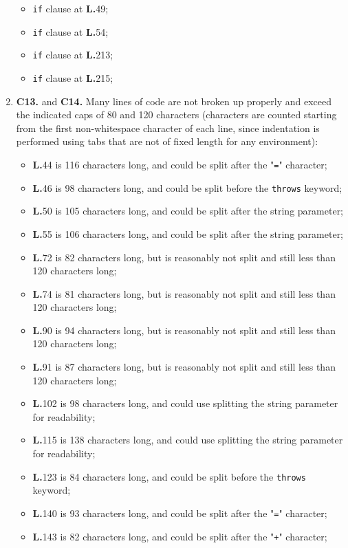\begin{enumerate}
	\begin{itemize}
	\item \texttt{if} clause at \textbf{L.}49;
	\item \texttt{if} clause at \textbf{L.}54;
	\item \texttt{if} clause at \textbf{L.}213;
	\item \texttt{if} clause at \textbf{L.}215;
	\end{itemize}
\item \textbf{C13.} and \textbf{C14.} Many lines of code are not broken up properly and exceed the indicated caps of 80 and 120 characters (characters are counted starting from the first non-whitespace character of each line, since indentation is performed using tabs that are not of fixed length for any environment):
	\begin{itemize}
	\item \textbf{L.}44 is 116 characters long, and could be split after the "\texttt{=}" character;
	\item \textbf{L.}46 is 98 characters long, and could be split before the \texttt{throws} keyword;
	\item \textbf{L.}50 is 105 characters long, and could be split after the string parameter;
	\item \textbf{L.}55 is 106 characters long, and could be split after the string parameter;
	\item \textbf{L.}72 is 82 characters long, but is reasonably not split and still less than 120 characters long;
	\item \textbf{L.}74 is 81 characters long, but is reasonably not split and still less than 120 characters long;
	\item \textbf{L.}90 is 94 characters long, but is reasonably not split and still less than 120 characters long;
	\item \textbf{L.}91 is 87 characters long, but is reasonably not split and still less than 120 characters long;
	\item \textbf{L.}102 is 98 characters long, and could use splitting the string parameter for readability;
	\item \textbf{L.}115 is 138 characters long, and could use splitting the string parameter for readability;
	\item \textbf{L.}123 is 84 characters long, and could be split before the \texttt{throws} keyword;
	\item \textbf{L.}140 is 93 characters long, and could be split after the "\texttt{=}" character;
	\item \textbf{L.}143 is 82 characters long, and could be split after the "\texttt{+}" character;

\end{itemize}
\end{enumerate}
